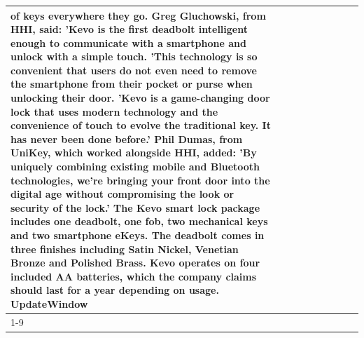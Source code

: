 \begin{table}[H]
\begin{tabular}{lllrlllll}
of keys everywhere they go. Greg Gluchowski, from HHI, said: 'Kevo is the first deadbolt intelligent enough to communicate with a smartphone and unlock with a simple touch. 'This technology is so convenient that users do not even need to remove the smartphone from their pocket or purse when unlocking their door. 'Kevo is a game-changing door lock that uses modern technology and the convenience of touch to evolve the traditional key. It has never been done before.' Phil Dumas, from UniKey, which worked alongside HHI, added: 'By uniquely combining existing mobile and Bluetooth technologies, we’re bringing your front door into the digital age without compromising the look or security of the lock.' The Kevo smart lock package includes one deadbolt, one fob, two mechanical keys and two smartphone eKeys. The deadbolt comes in three finishes including Satin Nickel, Venetian Bronze and Polished Brass. Kevo operates on four included AA batteries, which the company claims should last for a year depending on usage. UpdateWindow \\
\cline{1-9}

\end{tabular}
\end{table}
